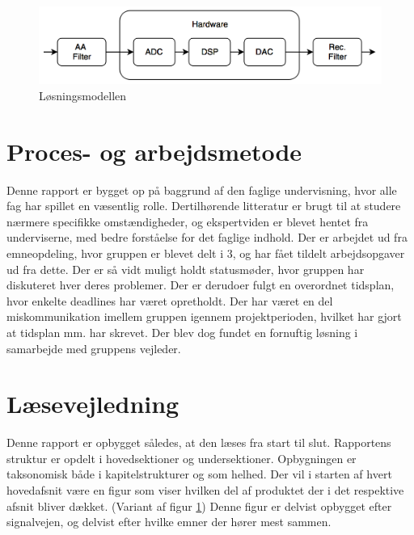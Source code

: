 \begin{figure}[h]
	\centering
	\includegraphics[width=15cm]{billeder/flow_losn}
	\caption{Løsningsmodellen}
	\label{fig:losningsmodel}
\end{figure}
\section{Proces- og arbejdsmetode}
Denne rapport er bygget op på baggrund af den faglige undervisning, hvor alle fag har spillet en væsentlig rolle. Dertilhørende litteratur er brugt til at studere nærmere specifikke omstændigheder, og ekspertviden er blevet hentet fra underviserne, med bedre forståelse for det faglige indhold. Der er arbejdet ud fra emneopdeling, hvor gruppen er blevet delt i 3, og har fået tildelt arbejdsopgaver ud fra dette. Der er så vidt muligt holdt statusmøder, hvor gruppen har diskuteret hver deres problemer. Der er derudoer fulgt en overordnet tidsplan, hvor enkelte deadlines har været opretholdt. Der har været en del miskommunikation imellem gruppen igennem projektperioden, hvilket har gjort at tidsplan mm. har skrevet. Der blev dog fundet en fornuftig løsning i samarbejde med gruppens vejleder.


\section{Læsevejledning}
Denne rapport er opbygget således, at den læses fra start til slut. Rapportens struktur er opdelt i hovedsektioner og undersektioner. Opbygningen er taksonomisk både i kapitelstrukturer og som helhed. Der vil i starten af hvert hovedafsnit være en figur som viser hvilken del af produktet der i det respektive afsnit bliver dækket. (Variant af figur \ref{fig:losningsmodel}) Denne figur er delvist opbygget efter signalvejen, og delvist efter hvilke emner der hører mest sammen.
